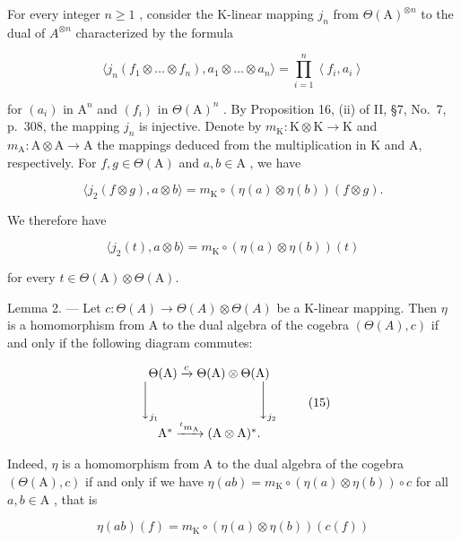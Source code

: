 For every integer \(n \geqslant 1\) , consider the K-linear mapping \(j_{n}\) from \(\Theta(\mathrm{A})^{\otimes n}\) to the dual of \(A^{\otimes n}\) characterized by the formula

\[
\langle j _ {n} \left(f _ {1} \otimes \dots \otimes f _ {n}\right), a _ {1} \otimes \dots \otimes a _ {n} \rangle = \prod_ {i = 1} ^ {n} \left\langle f _ {i}, a _ {i} \right\rangle\tag{13}
\]

for \((a_{i})\) in \(\mathrm{A}^n\) and \((f_i)\) in \(\Theta (\mathrm{A})^n\) . By Proposition 16, (ii) of II, §7, No.~7, p.~308, the mapping \(j_{n}\) is injective. Denote by \(m_{\mathrm{K}}:\mathrm{K}\otimes \mathrm{K}\to \mathrm{K}\) and \(m_{\mathrm{A}}:\mathrm{A}\otimes \mathrm{A}\rightarrow \mathrm{A}\) the mappings deduced from the multiplication in K and A, respectively. For \(f,g\in \Theta (\mathrm{A})\) and \(a,b\in \mathrm{A}\) , we have

\[
\langle j _ {2} (f \otimes g), a \otimes b \rangle = m _ {\mathrm{K}} \circ (\eta (a) \otimes \eta (b)) (f \otimes g).
\]

We therefore have

\[
\langle j _ {2} (t), a \otimes b \rangle = m _ {\mathrm{K}} \circ (\eta (a) \otimes \eta (b)) (t)\tag{14}
\]

for every \(t\in \Theta (\mathrm{A})\otimes \Theta (\mathrm{A})\).

Lemma 2. --- Let \(c: \Theta(A) \to \Theta(A) \otimes \Theta(A)\) be a K-linear mapping. Then \(\eta\) is a homomorphism from A to the dual algebra of the cogebra \((\Theta(A), c)\) if and only if the following diagram commutes:

\[
\begin{array}{c} \Theta (\mathrm{A}) \xrightarrow {c} \Theta (\mathrm{A}) \otimes \Theta (\mathrm{A}) \\ \Biggl \downarrow_ {j _ {1}} \qquad \qquad \qquad \qquad \Biggl \downarrow_ {j _ {2}} \\ \mathrm{A} ^ {*} \xrightarrow {^ t m _ {\mathrm{A}}} (\mathrm{A} \otimes \mathrm{A}) ^ {*}. \end{array}\tag{15}
\]

Indeed, \(\eta\) is a homomorphism from A to the dual algebra of the cogebra \((\Theta (\mathrm{A}),c)\) if and only if we have \(\eta (ab) = m_{\mathrm{K}}\circ (\eta (a)\otimes \eta (b))\circ c\) for all \(a,b\in \mathrm{A}\) , that is

\[
\eta (a b) (f) = m _ {\mathrm{K}} \circ (\eta (a) \otimes \eta (b)) (c (f))
\]

